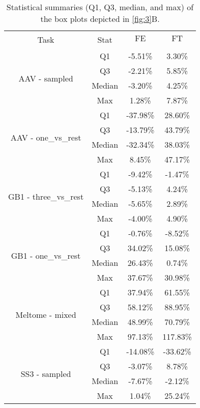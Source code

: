\begin{table}
	\caption{\centering Statistical summaries (Q1, Q3, median, and max) of the box plots depicted in \autoref{fig:3}B.}
	\label{tab:box}
	\centering
	\renewcommand{\arraystretch}{1.5}
	\begin{tabular}{cccc}
	\toprule
	\multicolumn{1}{c}{\multirow{2}{*}{Task}} & \multicolumn{1}{c}{\multirow{2}{*}{Stat}} & \multicolumn{1}{c}{FE} & FT \\
	\multicolumn{1}{c}{} & \multicolumn{1}{c}{} & \multicolumn{1}{c}{} & \\
	\midrule
	\multirow{4}{*}{AAV - sampled} & Q1 & -5.51\% & 3.30\% \\
	 & Q3 & -2.21\% & 5.85\% \\
	 & Median & -3.20\% & 4.25\% \\
	 & Max & 1.28\% & 7.87\% \\
	\hline
	\multirow{4}{*}{AAV - one\_vs\_rest} & Q1 & -37.98\% & 28.60\% \\
	 & Q3 & -13.79\% & 43.79\% \\
	 & Median & -32.34\% & 38.03\% \\
	 & Max & 8.45\% & 47.17\% \\
	\hline
	\multirow{4}{*}{GB1 - three\_vs\_rest} & Q1 & -9.42\% & -1.47\% \\
	 & Q3 & -5.13\% & 4.24\% \\
	 & Median & -5.65\% & 2.89\% \\
	 & Max & -4.00\% & 4.90\% \\
	\hline
	\multirow{4}{*}{GB1 - one\_vs\_rest} & Q1 & -0.76\% & -8.52\% \\
	 & Q3 & 34.02\% & 15.08\% \\
	 & Median & 26.43\% & 0.74\% \\
	 & Max & 37.67\% & 30.98\% \\
	\hline
	\multirow{4}{*}{Meltome - mixed} & Q1 & 37.94\% & 61.55\% \\
	 & Q3 & 58.12\% & 88.95\% \\
	 & Median & 48.99\% & 70.79\% \\
	 & Max & 97.13\% & 117.83\% \\
	\hline
	\multirow{4}{*}{SS3 - sampled} & Q1 & -14.08\% & -33.62\% \\
	 & Q3 & -3.07\% & 8.78\% \\
	 & Median & -7.67\% & -2.12\% \\
	 & Max & 1.04\% & 25.24\% \\
	\hline
	\end{tabular}
\end{table}
